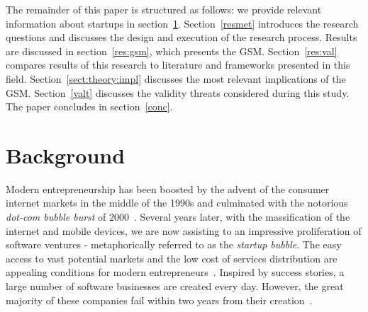\documentclass[10pt,journal,letterpaper,compsoc]{IEEEtran}
\begin{document}
The remainder of this paper is structured as follows: we provide relevant
information about startups in section~\ref{backg}. Section~\ref{resmet}
introduces the research questions and discusses the design and execution of the
research process. Results are discussed in section~\ref{res:gsm}, which presents
the GSM. Section~\ref{res:val} compares results of this research to literature
and frameworks presented in this field. Section~\ref{sect:theory:impl}
discusses the most relevant implications of the GSM. Section~\ref{valt} 
discusses the validity threats considered during this study. The paper
concludes in section~\ref{conc}.






 
\section{Background} \label{backg}

Modern entrepreneurship has been boosted by the advent of the consumer internet
markets in the middle of the 1990s and culminated with the notorious 
\textit{dot-com bubble burst} of 2000~\cite{Perkins:1999:IBI:555126,
storey1982entrepreneurship}. Several years later, with the massification of the
internet and mobile devices, we are now assisting to an impressive proliferation
of software ventures - metaphorically referred to as the \textit{startup 
bubble}. The easy access to vast potential markets and the low cost of services
distribution are appealing conditions for modern
entrepreneurs~\cite{Marmer2011}. Inspired by success stories, a large number of 
software businesses are created every day. However, the great majority of these 
companies fail within two years from their creation~\cite{Crowne2002}.
\end{document}
